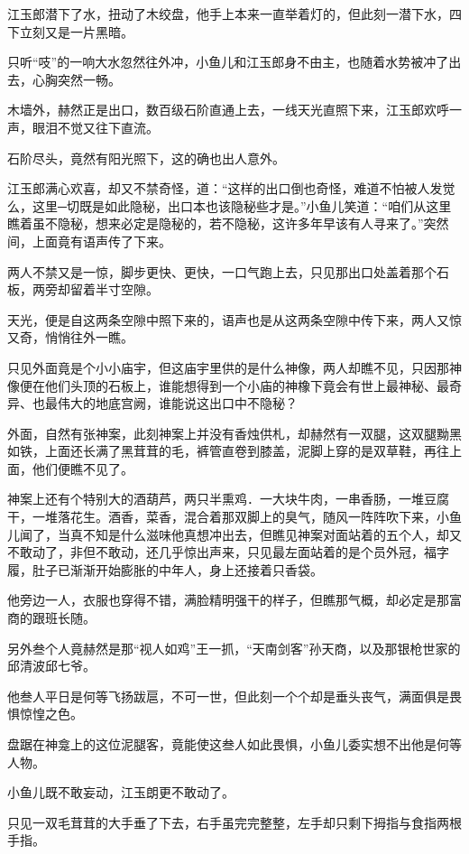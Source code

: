 \documentclass[12pt,oneside]{book}
\begin{document}
江玉郎潜下了水，扭动了木绞盘，他手上本来一直举着灯的，但此刻一潜下水，四下立刻又是一片黑暗。

只听``吱''的一响大水忽然往外冲，小鱼儿和江玉郎身不由主，也随着水势被冲了出去，心胸突然一畅。

木墙外，赫然正是出口，数百级石阶直通上去，一线天光直照下来，江玉郎欢呼一声，眼泪不觉又往下直流。

石阶尽头，竟然有阳光照下，这的确也出人意外。

江玉郎满心欢喜，却又不禁奇怪，道：``这样的出口倒也奇怪，难道不怕被人发觉么，这里─切既是如此隐秘，出口本也该隐秘些才是。''小鱼儿笑道：``咱们从这里瞧着虽不隐秘，想来必定是隐秘的，若不隐秘，这许多年早该有人寻来了。''突然间，上面竟有语声传了下来。

两人不禁又是一惊，脚步更快、更快，一口气跑上去，只见那出口处盖着那个石板，两旁却留着半寸空隙。

天光，便是自这两条空隙中照下来的，语声也是从这两条空隙中传下来，两人又惊又奇，悄悄往外一瞧。

只见外面竟是个小小庙宇，但这庙宇里供的是什么神像，两人却瞧不见，只因那神像便在他们头顶的石板上，谁能想得到一个小庙的神橡下竟会有世上最神秘、最奇异、也最伟大的地底宫阙，谁能说这出口中不隐秘？

外面，自然有张神案，此刻神案上并没有香烛供札，却赫然有一双腿，这双腿黝黑如铁，上面还长满了黑茸茸的毛，裤管直卷到膝盖，泥脚上穿的是双草鞋，再往上面，他们便瞧不见了。

神案上还有个特别大的酒葫芦，两只半熏鸡．一大块牛肉，一串香肠，一堆豆腐干，一堆落花生。酒香，菜香，混合着那双脚上的臭气，随风一阵阵吹下来，小鱼儿闻了，当真不知是什么滋味他真想冲出去，但瞧见神案对面站着的五个人，却又不敢动了，非但不敢动，还几乎惊出声来，只见最左面站着的是个员外冠，福字履，肚子已渐渐开始膨胀的中年人，身上还接着只香袋。

他旁边一人，衣服也穿得不错，满脸精明强干的样子，但瞧那气概，却必定是那富商的跟班长随。

另外叁个人竟赫然是那``视人如鸡''王一抓，``天南剑客''孙天商，以及那银枪世家的邱清波邱七爷。

他叁人平日是何等飞扬跋扈，不可一世，但此刻一个个却是垂头丧气，满面俱是畏惧惊惶之色。

盘踞在神龛上的这位泥腿客，竟能使这叁人如此畏惧，小鱼儿委实想不出他是何等人物。

小鱼儿既不敢妄动，江玉朗更不敢动了。

只见一双毛茸茸的大手垂了下去，右手虽完完整整，左手却只剩下拇指与食指两根手指。
\end{document}
